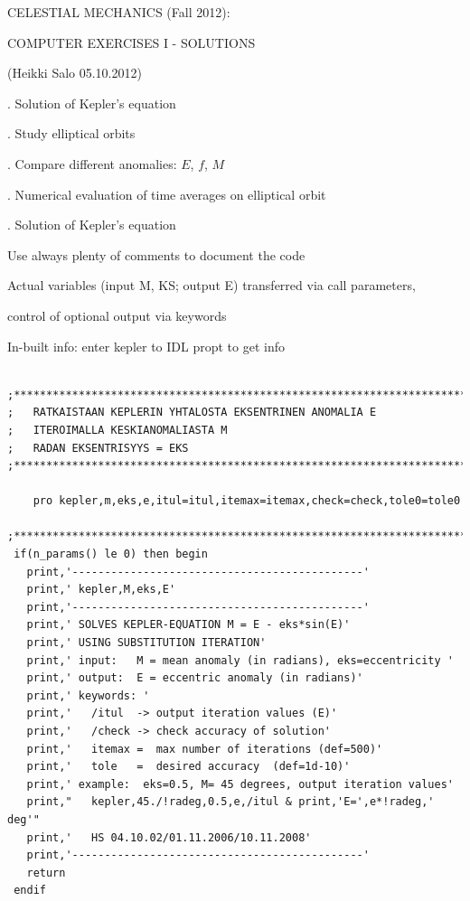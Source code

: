 \documentclass[a4paper,12pt]{article}
\def\red{\color{red}}
\def\black{\color{RGBblack}}
\begin{document}
{\centerline{}




{\norm
\vskip 0cm
{{\centerline { {\isob CELESTIAL MECHANICS (Fall 2012): }}}}
\vskip 0.2cm
{{\centerline { {\isob COMPUTER EXERCISES I - SOLUTIONS}}}}

{{\centerline { { (Heikki Salo 05.10.2012)}}}}

\vskip 2cm
{. Solution of Kepler's equation}

{. Study elliptical orbits}

{. Compare different anomalies: $E$, $f$, $M$}

{. Numerical evaluation of time averages on elliptical orbit}


\newpage

\black

{. Solution of Kepler's equation}

\vskip 0.35cm


\bul Use always plenty of comments to document the code

\bul Actual variables (input M, KS; output E) transferred via call parameters, 

\buu control of optional output via keywords

\bul In-built info:  enter {\red kepler } to IDL propt to get info





{\red \scriptsize
\begin{verbatim}

;****************************************************************************
;	RATKAISTAAN KEPLERIN YHTALOSTA EKSENTRINEN ANOMALIA E
;	ITEROIMALLA KESKIANOMALIASTA M
;	RADAN EKSENTRISYYS = EKS
;****************************************************************************

	pro kepler,m,eks,e,itul=itul,itemax=itemax,check=check,tole0=tole0

;****************************************************************************
 if(n_params() le 0) then begin
   print,'---------------------------------------------'
   print,' kepler,M,eks,E'
   print,'---------------------------------------------'
   print,' SOLVES KEPLER-EQUATION M = E - eks*sin(E)' 
   print,' USING SUBSTITUTION ITERATION'
   print,' input:   M = mean anomaly (in radians), eks=eccentricity '
   print,' output:  E = eccentric anomaly (in radians)'
   print,' keywords: '
   print,'   /itul  -> output iteration values (E)'
   print,'   /check -> check accuracy of solution'
   print,'   itemax =  max number of iterations (def=500)'
   print,'   tole   =  desired accuracy  (def=1d-10)'
   print,' example:  eks=0.5, M= 45 degrees, output iteration values'
   print,"   kepler,45./!radeg,0.5,e,/itul & print,'E=',e*!radeg,' deg'"
   print,'   HS 04.10.02/01.11.2006/10.11.2008'
   print,'---------------------------------------------'
   return
 endif


\end{verbatim}}}}
\end{document}
